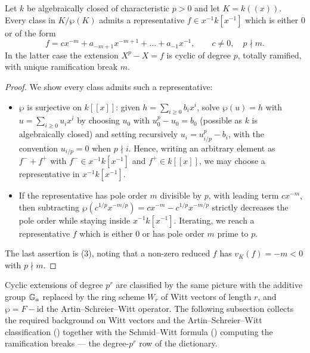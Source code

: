 \begin{lemma}\label{lemma:as_reduced_representatives}
    Let $k$ be algebraically closed of characteristic $p > 0$ and let
    $K = k((x))$. Every class in $K/\wp(K)$ admits a representative
    $f \in x^{-1}k[x^{-1}]$ which is either $0$ or of the form
    $$f = cx^{-m} + a_{-m+1}x^{-m+1} + \dots + a_{-1}x^{-1}, \qquad c \neq 0, \quad p \nmid m.$$
    In the latter case the extension $X^p - X = f$ is cyclic of degree $p$,
    totally ramified, with unique ramification break $m$.
\end{lemma}
\begin{proof}
    We show every class admits such a representative:
    \begin{itemize}
        \item $\wp$ is surjective on $k[[x]]$: given $h = \sum_{i \geq 0} b_i x^i$, solve
        $\wp(u) = h$ with $u = \sum_{i \geq 0} u_i x^i$ by choosing $u_0$ with $u_0^p - u_0 = b_0$ (possible as $k$ is algebraically closed)
        and setting recursively $u_i = u_{i/p}^p - b_i$, with the convention $u_{i/p} = 0$ when $p \nmid i$. Hence, writing an arbitrary
        element as $f^- + f^+$ with $f^- \in x^{-1}k[x^{-1}]$ and $f^+ \in k[[x]]$, we may
        choose a representative in $x^{-1}k[x^{-1}]$.
        \item If the representative has pole order $m$ divisible by $p$, with leading term $cx^{-m}$, then subtracting
        $\wp(c^{1/p}x^{-m/p}) = cx^{-m} - c^{1/p}x^{-m/p}$ strictly decreases the pole order while staying inside
        $x^{-1}k[x^{-1}]$. Iterating, we reach a representative $f$ which is either $0$ or has pole order $m$ prime to $p$.
    \end{itemize}
    The last assertion is (3),
    noting that a non-zero reduced $f$ has $v_K(f) = -m < 0$ with $p \nmid m$.
\end{proof}

Cyclic extensions of degree $p^r$ are classified by the same picture with the
additive group $\mathbb{G}_a$ replaced by the ring scheme $W_r$ of Witt vectors of
length $r$, and $\wp = F - \mathrm{id}$ the Artin--Schreier--Witt operator.
The following subsection collects the required background on Witt vectors and
the Artin--Schreier--Witt classification
() together with the Schmid--Witt formula
() computing the ramification breaks
--- the degree-$p^r$ row of the dictionary.

